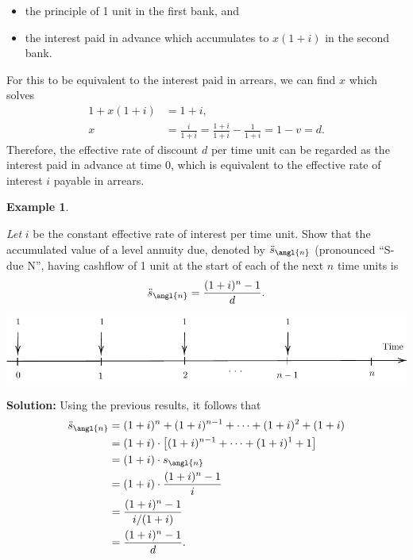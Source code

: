 \documentclass[landscape, 20pt]{extreport}
\theoremstyle{definition}
\theoremstyle{definition}
\newtheorem{example}{Example}[chapter]
\theoremstyle{definition}
\theoremstyle{definition}
\theoremstyle{remark}
\begin{document}
\begin{itemize}
\item
  the principle of 1 unit in the first bank, and
\item
  the interest paid in advance which accumulates to \(x(1+i)\) in the
  second bank.
\end{itemize}

For this to be equivalent to the interest paid in arrears, we can find
\(x\) which solves \[\begin{aligned}
     1 + x(1+i) &= 1 + i,\\
     x &= \frac{i}{1+i} = \frac{1+i}{1+i} - \frac{1}{1+i}  = 1-v = d.\end{aligned}\]
Therefore, the effective rate of discount \(d\) per time unit can be
regarded as the interest paid in advance at time 0, which is equivalent
to the effective rate of interest \(i\) payable in arrears.

\newpage \begin{example}
\protect\hypertarget{exm:unlabeled-div-30}{}\label{exm:unlabeled-div-30}

\emph{Let} \(i\) be the constant effective rate of interest per time unit. Show
that the accumulated value of a level annuity due, denoted by
\(\ddot{s}_\angl{n}\) (pronounced ``S-due N'', having cashflow of 1 unit at
the start of each of the next \(n\) time units is
\[\ddot{s}_\angl{n} = \frac{(1+i)^n -1 }{d}.\]

\end{example}

\begin{center}\includegraphics{tikz-ex16-1} \end{center}

\textbf{Solution:} Using the previous results, it follows that
\[\begin{aligned}
 \ddot{s}_\angl{n} &= (1+i)^n + (1+i)^{n-1} + \cdots + (1+i)^2 + (1+i) \\
            &= (1+i) \cdot \left[(1+i)^{n-1} + \cdots + (1+i)^1 + 1\right] \\
            &= (1+i) \cdot {s}_\angl{n} \\
            &= (1+i) \cdot \frac{(1+i)^n -1 }{i}\\
            &=  \frac{(1+i)^n -1 }{i/(1+i)}\\
            &=  \frac{(1+i)^n -1 }{d}.\end{aligned}\]
\end{document}
